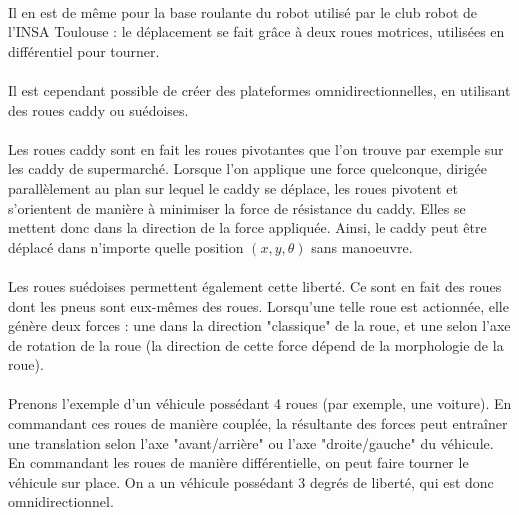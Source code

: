 \documentclass[a4paper,10pt]{article}
\begin{document}
            \paragraph{}
                Il en est de même pour la base roulante du robot utilisé
                par le club robot de l'INSA Toulouse : le déplacement se 
                fait grâce à deux roues motrices, utilisées en différentiel
                pour tourner. 
                
            \paragraph{}
                Il est cependant possible de créer des plateformes omnidirectionnelles, 
                en utilisant des roues caddy ou suédoises. 
                
            \paragraph{}
                Les roues caddy sont en fait les roues pivotantes que l'on 
                trouve par exemple sur les caddy de supermarché.
                Lorsque l'on applique une force quelconque, dirigée 
                parallèlement au plan sur lequel le caddy se déplace, les roues
                pivotent et s'orientent de manière à minimiser la force de 
                résistance du caddy. Elles se mettent donc dans la direction 
                de la force appliquée. Ainsi, le caddy peut être déplacé dans 
                n'importe quelle position $(x, y, \theta)$ sans manoeuvre. 
                
            \paragraph{}
                Les roues suédoises permettent également cette liberté. Ce sont en
                fait des roues dont les pneus sont eux-mêmes des roues. 
                Lorsqu'une telle roue est actionnée, elle génère deux forces 
                : une dans la direction "classique" de la roue, et une selon l'axe 
                de rotation de la roue (la direction de cette force dépend de la
                morphologie de la roue). 
                
            \paragraph{}
                Prenons l'exemple d'un véhicule possédant 4 roues (par exemple, une 
                voiture). En commandant ces roues de manière couplée, la résultante des 
                forces peut entraîner une translation selon 
                l'axe "avant/arrière" ou l'axe "droite/gauche" du véhicule. 
                En commandant les roues de manière différentielle, on peut faire tourner
                le véhicule sur place. 
                On a un véhicule possédant 3 degrés de liberté, qui est donc omnidirectionnel.
                
\end{document}
